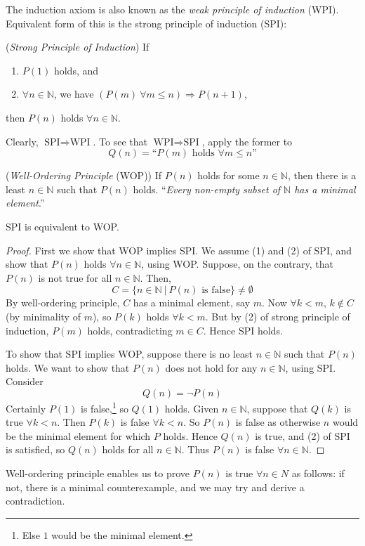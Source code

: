 \documentclass[10pt, a4paper, twoside]{report}
\begin{document}
The induction axiom is also known as the \emph{weak principle of induction} (WPI). Equivalent form of this is the strong principle of induction (SPI):
\begin{theorem}
    (\emph{Strong Principle of Induction}) If
    \begin{enumerate}
        \item \(P(1)\) holds, and
        \item \(\forall n\in\mathbb{N}\), we have \((P(m)\:\forall m\leq n)\Rightarrow P(n+1)\), 
    \end{enumerate}
    then \(P(n)\) holds \(\forall n\in\mathbb{N}\).
\end{theorem}
Clearly, \(\text{SPI}\Rightarrow\text{WPI}\). To see that \(\text{WPI}\Rightarrow\text{SPI}\), apply the former to
\[Q(n)=\text{``\(P(m)\) holds \(\forall m\leq n\)''}\]
\begin{theorem}
    (\emph{Well-Ordering Principle} (WOP)) If \(P(n)\) holds for some \(n\in\mathbb{N}\), then there is a least \(n\in\mathbb{N}\) such that \(P(n)\) holds. ``\emph{Every non-empty subset of \(\mathbb{N}\) has a minimal element}.''
\end{theorem}
\begin{theorem}
    SPI is equivalent to WOP.
\end{theorem}
\begin{proof}
    First we show that WOP implies SPI. We assume (1) and (2) of SPI, and show that \(P(n)\) holds \(\forall n\in\mathbb{N}\), using WOP. Suppose, on the contrary, that \(P(n)\) is not true for all \(n\in\mathbb{N}\). Then,
    \[C=\{n\in\mathbb{N}\:|\:P(n)\text{ is false}\}\neq\emptyset\]
    By well-ordering principle, \(C\) has a minimal element, say \(m\). Now \(\forall k<m\), \(k\notin C\) (by minimality of \(m\)), so \(P(k)\) holds \(\forall k<m\). But by (2) of strong principle of induction, \(P(m)\) holds, contradicting \(m\in C\). Hence SPI holds.

    To show that SPI implies WOP, suppose there is no least \(n\in\mathbb{N}\) such that \(P(n)\) holds. We want to show that \(P(n)\) does not hold for any \(n\in\mathbb{N}\), using SPI. Consider
    \[Q(n)=\neg P(n)\]
    Certainly \(P(1)\) is false,\footnote{Else \(1\) would be the minimal element.} so \(Q(1)\) holds. Given \(n\in\mathbb{N}\), suppose that \(Q(k)\) is true \(\forall k<n\). Then \(P(k)\) is false \(\forall k<n\). So \(P(n)\) is false as otherwise \(n\) would be the minimal element for which \(P\) holds. Hence \(Q(n)\) is true, and (2) of SPI is satisfied, so \(Q(n)\) holds for all \(n\in\mathbb{N}\). Thus \(P(n)\) is false \(\forall n\in\mathbb{N}\).
\end{proof}
Well-ordering principle enables us to prove \(P(n)\) is true \(\forall n\in N\) as follows: if not, there is a minimal counterexample, and we may try and derive a contradiction.
\end{document}
